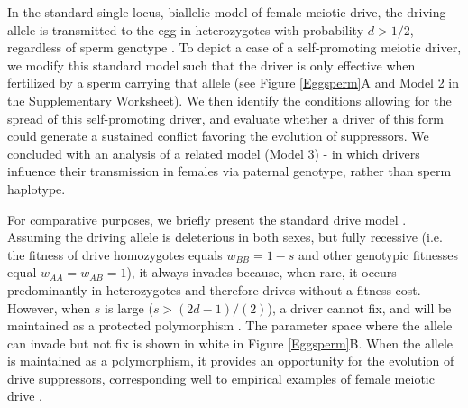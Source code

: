 \documentclass[12pt,letterpaper]{article}
\begin{document}
In the standard single-locus, biallelic model of female meiotic drive,
the driving allele is transmitted to the egg in heterozygotes with
probability  $d > 1/2$, regardless of sperm genotype \cite[e.g. ][ and see Model 1 in the Appendix for more details]{Ubeda2004}. %
          To depict a case
of a self-promoting meiotic driver,  we modify this standard model such 
	that the driver is only effective when fertilized by a sperm carrying that allele (see Figure \ref{Eggsperm}A and Model 2 in the Supplementary Worksheet). 
We then identify the conditions allowing for the spread of this self-promoting driver, 
	and evaluate whether a driver of this form could generate a sustained conflict favoring the evolution of suppressors. 
We concluded with an analysis of a related model (Model 3) - in which
drivers influence their transmission in females via paternal genotype,
rather than sperm haplotype. 

For comparative purposes, we briefly present the standard drive model %
	\citep[see e.g. ][ for additional results]{Prout1973,Ubeda2004}. 
Assuming the driving allele is deleterious in both sexes, but fully recessive 
	(i.e. the fitness of drive homozygotes equals $w_{BB}=1-s$ and other genotypic fitnesses equal $w_{AA}=w_{AB}=1$), 
	it always invades because,  when rare, it occurs predominantly in heterozygotes and therefore drives without a fitness cost. 
However, when $s$ is large ($s>(2d-1)/(2)$), a driver cannot fix, and
will be maintained as a protected polymorphism \citep{Prout1973}. 
The parameter space where the allele can invade but not fix is shown in white
        in Figure \ref{Eggsperm}B. %
When the allele is maintained as a polymorphism, it provides an opportunity for the evolution of
	drive suppressors, corresponding well to empirical examples of
        female meiotic drive \citep[reviewed in ][]{Burt2006}. 
\end{document}
